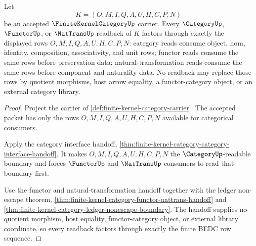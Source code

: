 \begin{theorem}
\label{thm:finite-kernel-category-category-functor-nattrans-row-readback}
Let
$$
K=(O,M,I,Q,A,U,H,C,P,N)
$$
be an accepted $\FiniteKernelCategoryUp$ carrier. Every $\CategoryUp$,
$\FunctorUp$, or $\NatTransUp$ readback of $K$ factors through exactly the
displayed rows $O,M,I,Q,A,U,H,C,P,N$: category reads consume object, hom,
identity, composition, associativity, and unit rows; functor reads consume the
same rows before preservation data; natural-transformation reads consume the
same rows before component and naturality data. No readback may replace those
rows by quotient morphisms, host arrow equality, a functor-category object, or
an external category library.
\end{theorem}
\begin{proof}
Project the carrier of \autoref{def:finite-kernel-category-carrier}. The
accepted packet has only the rows $O,M,I,Q,A,U,H,C,P,N$ available for
categorical consumers.

Apply the category interface handoff,
\autoref{thm:finite-kernel-category-category-interface-handoff}. It makes
$O,M,I,Q,A,U,H,C,P,N$ the $\CategoryUp$-readable boundary and forces
$\FunctorUp$ and $\NatTransUp$ consumers to read that boundary first.

Use the functor and natural-transformation handoff together with the ledger
non-escape theorem, \autoref{thm:finite-kernel-category-functor-nattrans-handoff}
and \autoref{thm:finite-kernel-category-ledger-nonescape-boundary}. The
handoff supplies no quotient morphism, host equality, functor-category object,
or external library coordinate, so every readback factors through exactly the
finite BEDC row sequence.
\end{proof}

